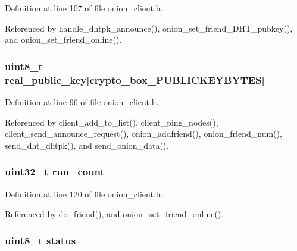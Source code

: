 Definition at line 107 of file onion\+\_\+client.\+h.



Referenced by handle\+\_\+dhtpk\+\_\+announce(), onion\+\_\+set\+\_\+friend\+\_\+\+D\+H\+T\+\_\+pubkey(), and onion\+\_\+set\+\_\+friend\+\_\+online().

\hypertarget{struct_onion___friend_a996dcaefa2a5954a199e2beb584c1feb}{
\subsubsection[{real\+\_\+public\+\_\+key}]{\setlength{\rightskip}{0pt plus 5cm}uint8\+\_\+t real\+\_\+public\+\_\+key\mbox{[}crypto\+\_\+box\+\_\+\+P\+U\+B\+L\+I\+C\+K\+E\+Y\+B\+Y\+T\+E\+S\mbox{]}}}\label{struct_onion___friend_a996dcaefa2a5954a199e2beb584c1feb}


Definition at line 96 of file onion\+\_\+client.\+h.



Referenced by client\+\_\+add\+\_\+to\+\_\+list(), client\+\_\+ping\+\_\+nodes(), client\+\_\+send\+\_\+announce\+\_\+request(), onion\+\_\+addfriend(), onion\+\_\+friend\+\_\+num(), send\+\_\+dht\+\_\+dhtpk(), and send\+\_\+onion\+\_\+data().

\hypertarget{struct_onion___friend_a9b6e91b90249c9b72d98611ba5ed7176}{
\subsubsection[{run\+\_\+count}]{\setlength{\rightskip}{0pt plus 5cm}uint32\+\_\+t run\+\_\+count}}\label{struct_onion___friend_a9b6e91b90249c9b72d98611ba5ed7176}


Definition at line 120 of file onion\+\_\+client.\+h.



Referenced by do\+\_\+friend(), and onion\+\_\+set\+\_\+friend\+\_\+online().

\hypertarget{struct_onion___friend_ade818037fd6c985038ff29656089758d}{
\subsubsection[{status}]{\setlength{\rightskip}{0pt plus 5cm}uint8\+\_\+t status}}\label{struct_onion___friend_ade818037fd6c985038ff29656089758d}


